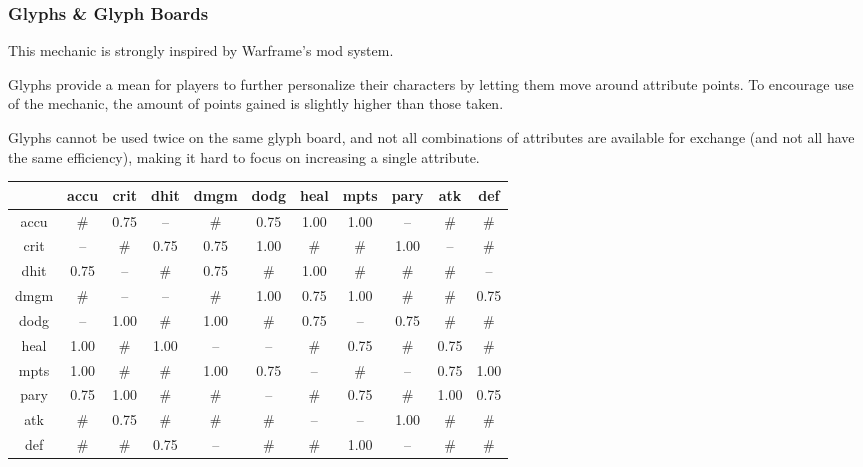 \subsubsection{Glyphs \& Glyph Boards}
This mechanic is strongly inspired by Warframe's mod system.

Glyphs provide a mean for players to further personalize their characters by
letting them move around attribute points. To encourage use of the mechanic, the
amount of points gained is slightly higher than those taken.

Glyphs cannot be used twice on the same glyph board, and not all combinations of
attributes are available for exchange (and not all have the same efficiency),
making it hard to focus on increasing a single attribute.

\begin{tabular}{|c|c|c|c|c|c|c|c|c|c|c|}
\hline
     & accu & crit & dhit & dmgm & dodg & heal & mpts & pary & atk  & def  \\
\hline
accu &  \#  & 0.75 &  --  &  \#  & 0.75 & 1.00 & 1.00 &  --  &  \#  &  \#  \\
\hline
crit &  --  &  \#  & 0.75 & 0.75 & 1.00 &  \#  &  \#  & 1.00 &  --  &  \#  \\
\hline
dhit & 0.75 &  --  &  \#  & 0.75 &  \#  & 1.00 &  \#  &  \#  &  \#  &  --  \\
\hline
dmgm &  \#  &  --  &  --  &  \#  & 1.00 & 0.75 & 1.00 &  \#  &  \#  & 0.75 \\
\hline
dodg &  --  & 1.00 &  \#  & 1.00 &  \#  & 0.75 &  --  & 0.75 &  \#  &  \#  \\
\hline
heal & 1.00 &  \#  & 1.00 &  --  &  --  &  \#  & 0.75 &  \#  & 0.75 &  \#  \\
\hline
mpts & 1.00 &  \#  &  \#  & 1.00 & 0.75 &  --  &  \#  &  --  & 0.75 & 1.00 \\
\hline
pary & 0.75 & 1.00 &  \#  &  \#  &  --  &  \#  & 0.75 &  \#  & 1.00  & 0.75 \\
\hline
atk  &  \#  & 0.75 &  \#  &  \#  &  \#  &  --  &  --  & 1.00 &  \#  &  \#  \\
\hline
def  &  \#  &  \#  & 0.75 &  --  &  \#  &  \#  & 1.00 &  --  &  \#  &  \#  \\
\hline
\end{tabular}
